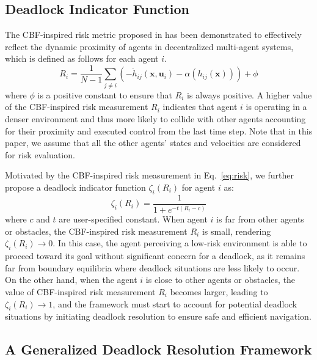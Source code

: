 \documentclass[letterpaper, 10 pt, conference]{ieeeconf}
\theoremstyle{plain}
\begin{document}
\subsection{Deadlock Indicator Function}
The CBF-inspired risk metric proposed in \cite{lyu2023risk} has been demonstrated to effectively reflect the dynamic proximity of agents in decentralized multi-agent systems,
which is defined as follows for each agent $i$.
\begin{equation} \label{eq:risk}
R_i = \frac{1}{N-1}\sum_{j \neq i} (-\dot{h}_{ij}(\mathbf{x}, \mathbf{u}_i)-\alpha (h_{ij}(\mathbf{x}))) + \phi
\end{equation}
where $\phi$ is a positive constant to ensure that $R_i$ is always positive. 
A higher value of the CBF-inspired risk measurement $R_i$ indicates that agent $i$ is operating in a denser environment and thus more likely to collide with other agents 
accounting for their proximity and executed control from the last time step. Note that in this paper, we assume that all the other agents' states and velocities are considered for risk evaluation. 


Motivated by the CBF-inspired risk measurement in Eq.~\eqref{eq:risk}, we further propose a deadlock indicator function $\zeta_i(R_i)$ for agent $i$ as:
\begin{equation} \label{eq:sigmoid}
    \zeta_i(R_i) =  \frac{1}{1+e^{-t(R_i-c)}}
\end{equation}
where $c$ and $t$ are user-specified constant. When agent $i$ is far from other agents or obstacles, the CBF-inspired risk measurement $R_i$ is small, rendering $\zeta_i(R_i) \rightarrow 0$. In this case, the agent perceiving a low-risk environment is able to proceed toward its goal without significant concern for a deadlock, as it remains far from boundary equilibria where deadlock situations are less likely to occur. 
On the other hand, when the agent $i$ is close to other agents or obstacles, the value of CBF-inspired risk measurement $R_i$ becomes larger, leading to $\zeta_i(R_i) \rightarrow 1$, and the framework must start to account for potential deadlock situations by initiating deadlock resolution to ensure safe and efficient navigation.






\subsection{A Generalized Deadlock Resolution Framework}
\end{document}
